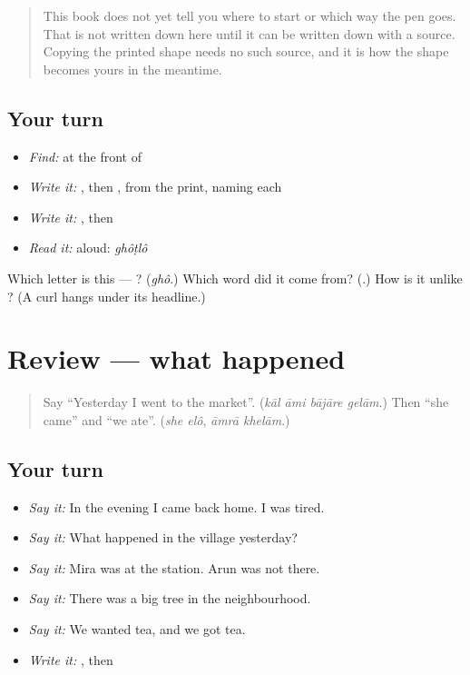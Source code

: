 \begin{quote}
This book does not yet tell you where to start  or which way the pen goes. That is not written down here until it can be written down with a source. Copying the printed shape needs no such source, and it is how the shape becomes yours in the meantime.
\end{quote}

\subsection*{Your turn}
\begin{itemize}
\raggedright
  \item \emph{Find:}  at the front of \textbf{}
  \item \emph{Write it:} , then , from the print, naming each
  \item \emph{Write it:} \textbf{}, then \textbf{}
  \item \emph{Read it:} \textbf{} aloud: \emph{ghôṭlô}
\end{itemize}

\begin{tcolorbox}[breakable,colback=teal!4,colframe=teal!35!black,title={Before you move on}]
Which letter is this — ? (\emph{ghô}.) Which word did it come from? (\textbf{}.) How is it unlike \textbf{}? (A curl hangs under its headline.)
\end{tcolorbox}
\section[(review)]{Review — what happened}

\label{lesson:BN-R264-what-happened}



\begin{quote}
Say \textquotedblleft{}Yesterday I went to the market\textquotedblright{}. (\emph{kāl āmi bājāre gelām}.) Then \textquotedblleft{}she came\textquotedblright{} and \textquotedblleft{}we ate\textquotedblright{}. (\emph{she elô}, \emph{āmrā khelām}.)
\end{quote}

\subsection*{Your turn}
\begin{itemize}
\raggedright
  \item \emph{Say it:} In the evening I came back home. I was tired.
  \item \emph{Say it:} What happened in the village yesterday?
  \item \emph{Say it:} Mira was at the station. Arun was not there.
  \item \emph{Say it:} There was a big tree in the neighbourhood.
  \item \emph{Say it:} We wanted tea, and we got tea.
  \item \emph{Write it:} , then \textbf{}
\end{itemize}

